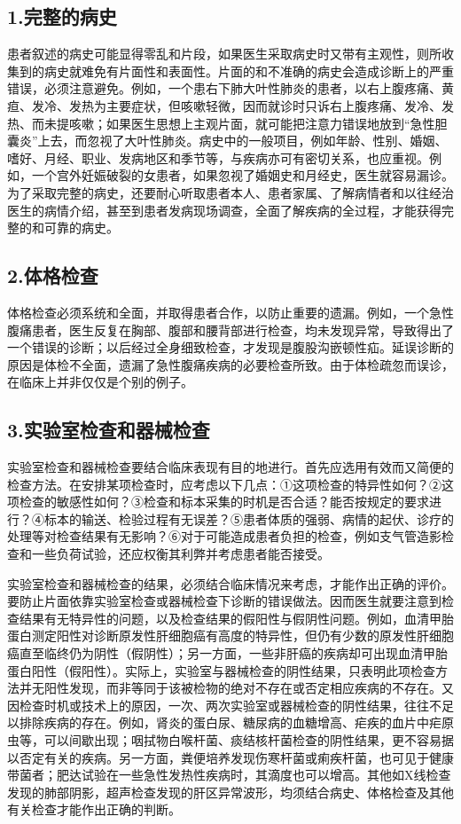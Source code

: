 \subsection{1.完整的病史}

患者叙述的病史可能显得零乱和片段，如果医生采取病史时又带有主观性，则所收集到的病史就难免有片面性和表面性。片面的和不准确的病史会造成诊断上的严重错误，必须注意避免。例如，一个患右下肺大叶性肺炎的患者，以右上腹疼痛、黄疸、发冷、发热为主要症状，但咳嗽轻微，因而就诊时只诉右上腹疼痛、发冷、发热、而未提咳嗽；如果医生思想上主观片面，就可能把注意力错误地放到“急性胆囊炎”上去，而忽视了大叶性肺炎。病史中的一般项目，例如年龄、性别、婚姻、嗜好、月经、职业、发病地区和季节等，与疾病亦可有密切关系，也应重视。例如，一个宫外妊娠破裂的女患者，如果忽视了婚姻史和月经史，医生就容易漏诊。为了采取完整的病史，还要耐心听取患者本人、患者家属、了解病情者和以往经治医生的病情介绍，甚至到患者发病现场调查，全面了解疾病的全过程，才能获得完整的和可靠的病史。

\subsection{2.体格检查}

体格检查必须系统和全面，并取得患者合作，以防止重要的遗漏。例如，一个急性腹痛患者，医生反复在胸部、腹部和腰背部进行检查，均未发现异常，导致得出了一个错误的诊断；以后经过全身细致检查，才发现是腹股沟嵌顿性疝。延误诊断的原因是体检不全面，遗漏了急性腹痛疾病的必要检查所致。由于体检疏忽而误诊，在临床上并非仅仅是个别的例子。

\subsection{3.实验室检查和器械检查}

实验室检查和器械检查要结合临床表现有目的地进行。首先应选用有效而又简便的检查方法。在安排某项检查时，应考虑以下几点：①这项检查的特异性如何？②这项检查的敏感性如何？③检查和标本采集的时机是否合适？能否按规定的要求进行？④标本的输送、检验过程有无误差？⑤患者体质的强弱、病情的起伏、诊疗的处理等对检查结果有无影响？⑥对于可能造成患者负担的检查，例如支气管造影检查和一些负荷试验，还应权衡其利弊并考虑患者能否接受。

实验室检查和器械检查的结果，必须结合临床情况来考虑，才能作出正确的评价。要防止片面依靠实验室检查或器械检查下诊断的错误做法。因而医生就要注意到检查结果有无特异性的问题，以及检查结果的假阳性与假阴性问题。例如，血清甲胎蛋白测定阳性对诊断原发性肝细胞癌有高度的特异性，但仍有少数的原发性肝细胞癌直至临终仍为阴性（假阴性）；另一方面，一些非肝癌的疾病却可出现血清甲胎蛋白阳性（假阳性）。实际上，实验室与器械检查的阴性结果，只表明此项检查方法并无阳性发现，而非等同于该被检物的绝对不存在或否定相应疾病的不存在。又因检查时机或技术上的原因，一次、两次实验室或器械检查的阴性结果，往往不足以排除疾病的存在。例如，肾炎的蛋白尿、糖尿病的血糖增高、疟疾的血片中疟原虫等，可以间歇出现；咽拭物白喉杆菌、痰结核杆菌检查的阴性结果，更不容易据以否定有关的疾病。另一方面，粪便培养发现伤寒杆菌或痢疾杆菌，也可见于健康带菌者；肥达试验在一些急性发热性疾病时，其滴度也可以增高。其他如X线检查发现的肺部阴影，超声检查发现的肝区异常波形，均须结合病史、体格检查及其他有关检查才能作出正确的判断。

